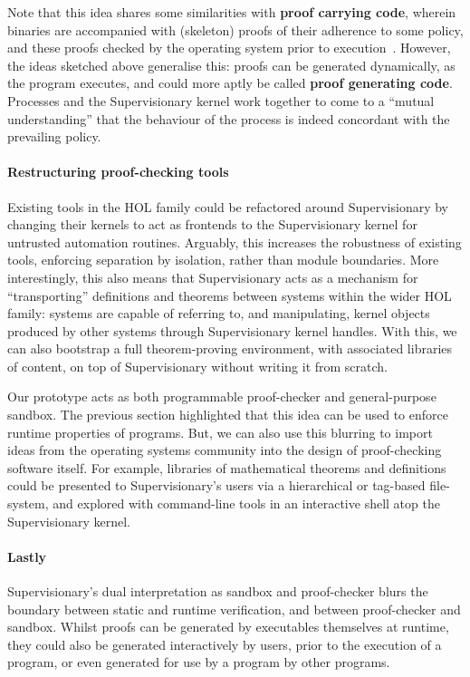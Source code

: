 \documentclass[sigplan, review]{acmart}
\newcommand{\deffont}[1]{\textbf{#1}}
\begin{document}
Note that this idea shares some similarities with \deffont{proof carrying code}, wherein binaries are accompanied with (skeleton) proofs of their adherence to some policy, and these proofs checked by the operating system prior to execution~\cite{DBLP:conf/popl/Necula97}.
However, the ideas sketched above generalise this: proofs can be generated dynamically, as the program executes, and could more aptly be called \deffont{proof generating code}.
Processes and the Supervisionary kernel work together to come to a ``mutual understanding'' that the behaviour of the process is indeed concordant with the prevailing policy. 

\paragraph{Restructuring proof-checking tools}

Existing tools in the HOL family could be refactored around Supervisionary by changing their kernels to act as frontends to the Supervisionary kernel for untrusted automation routines.
Arguably, this increases the robustness of existing tools, enforcing separation by isolation, rather than module boundaries.
More interestingly, this also means that Supervisionary acts as a mechanism for ``transporting'' definitions and theorems between systems within the wider HOL family: systems are capable of referring to, and manipulating, kernel objects produced by other systems through Supervisionary kernel handles.
With this, we can also bootstrap a full theorem-proving environment, with associated libraries of content, on top of Supervisionary without writing it from scratch.

Our prototype acts as both programmable proof-checker and general-purpose sandbox.
The previous section highlighted that this idea can be used to enforce runtime properties of programs.
But, we can also use this blurring to import ideas from the operating systems community into the design of proof-checking software itself.
For example, libraries of mathematical theorems and definitions could be presented to Supervisionary's users via a hierarchical or tag-based file-system, and explored with command-line tools in an interactive shell atop the Supervisionary kernel.

\paragraph{Lastly}

Supervisionary's dual interpretation as sandbox and proof-checker blurs the boundary between static and runtime verification, and between proof-checker and sandbox.
Whilst proofs can be generated by executables themselves at runtime, they could also be generated interactively by users, prior to the execution of a program, or even generated for use by a program by other programs.
\end{document}
